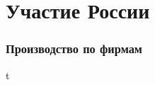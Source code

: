 \section{Участие России}

\begin{frame}
    \frametitle{Производство по фирмам}
    \begin{center}
        t
    \end{center}
\end{frame}